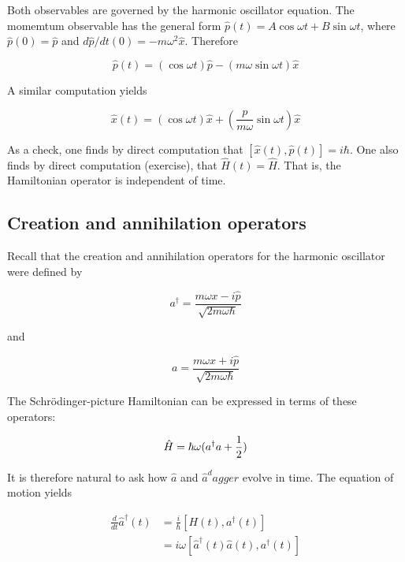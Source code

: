 Both observables are governed by the harmonic oscillator equation.
The momemtum observable has the general form $\hat p(t) = A\cos \omega t + B\sin\omega t$, where $\hat p(0) = \hat p$ and $d\hat p/dt(0) = -m\omega^2 \hat x$.
Therefore 

\begin{equation}
\hat p(t) = (\cos\omega t) \hat p -  (m\omega \sin \omega t) \hat x
\end{equation}

A similar computation yields

\begin{equation}
\hat x(t) = (\cos\omega t) \hat x +  \left(\frac{p}{m\omega} \sin \omega t\right) \hat x
\end{equation}

As a check, one finds by direct computation that  $[\hat x(t), \hat p(t)] = i\hbar$. One also finds by direct computation (exercise), that $\hat H(t) = \hat H$.  That is, the Hamiltonian operator is independent of time.




\subsection{Creation and annihilation operators}

Recall that the creation and annihilation operators for the harmonic oscillator were defined by

\begin{equation}
\label{creationop2}
a^\dagger = \frac{m\omega x - i\hat p}{\sqrt{2m\omega\hbar}}
\end{equation}

and 

\begin{equation}
\label{annihilationop2}
a = \frac{m\omega x + i\hat p}{\sqrt{2m\omega\hbar}}
\end{equation}

The  Schrödinger-picture Hamiltonian can be expressed in terms of these operators:

\begin{equation}
\hat H = \hbar \omega(a^\dagger a + \small{\frac{1}{2}})
\end{equation}

It is therefore natural to ask how $\hat a$ and $\hat a^dagger$ evolve in time. The equation of motion yields

\begin{align}
\frac{d}{dt}\hat a^\dagger(t) &= \frac{i}{\hbar}[H(t), a^\dagger(t)] \\
&= i\omega [\hat a^\dagger(t) \hat a(t), a^\dagger(t)]
\end{align}

